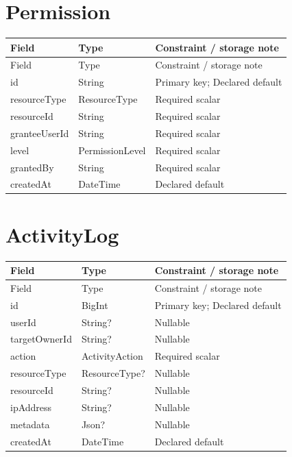 \documentclass[11pt,a4paper,oneside]{report}
\begin{document}
\section{Permission}
\begin{longtable}{p{.31\linewidth}p{.23\linewidth}p{.36\linewidth}}\toprule Field&Type&Constraint / storage note\\\midrule\endfirsthead\toprule Field&Type&Constraint / storage note\\\midrule\endhead
id&String&Primary key; Declared default\\
resourceType&ResourceType&Required scalar\\
resourceId&String&Required scalar\\
granteeUserId&String&Required scalar\\
level&PermissionLevel&Required scalar\\
grantedBy&String&Required scalar\\
createdAt&DateTime&Declared default\\
\bottomrule\end{longtable}

\section{ActivityLog}
\begin{longtable}{p{.31\linewidth}p{.23\linewidth}p{.36\linewidth}}\toprule Field&Type&Constraint / storage note\\\midrule\endfirsthead\toprule Field&Type&Constraint / storage note\\\midrule\endhead
id&BigInt&Primary key; Declared default\\
userId&String?&Nullable\\
targetOwnerId&String?&Nullable\\
action&ActivityAction&Required scalar\\
resourceType&ResourceType?&Nullable\\
resourceId&String?&Nullable\\
ipAddress&String?&Nullable\\
metadata&Json?&Nullable\\
createdAt&DateTime&Declared default\\
\bottomrule\end{longtable}
\end{document}
